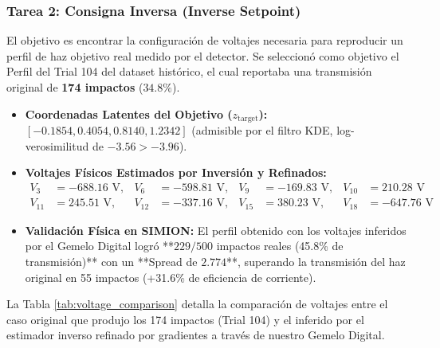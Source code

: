 \documentclass[12pt,letterpaper]{article}
\begin{document}
\subsubsection{Tarea 2: Consigna Inversa (Inverse Setpoint)}
El objetivo es encontrar la configuración de voltajes necesaria para reproducir un perfil de haz objetivo real medido por el detector. Se seleccionó como objetivo el Perfil del Trial 104 del dataset histórico, el cual reportaba una transmisión original de \textbf{174 impactos} ($34.8\%$).
\begin{itemize}
    \item \textbf{Coordenadas Latentes del Objetivo ($z_{\text{target}}$):} $[-0.1854, 0.4054, 0.8140, 1.2342]$ (admisible por el filtro KDE, log-verosimilitud de $-3.56 > -3.96$).
    \item \textbf{Voltajes Físicos Estimados por Inversión y Refinados:} 
    \begin{align*}
        V_3 &= -688.16\text{ V}, & V_6 &= -598.81\text{ V}, & V_9 &= -169.83\text{ V}, & V_{10} &= 210.28\text{ V} \\
        V_{11} &= 245.51\text{ V}, & V_{12} &= -337.16\text{ V}, & V_{15} &= 380.23\text{ V}, & V_{18} &= -647.76\text{ V}
    \end{align*}
    \item \textbf{Validación Física en SIMION:} El perfil obtenido con los voltajes inferidos por el Gemelo Digital logró **$229/500$ impactos reales (45.8\% de transmisión)** con un **Spread de $2.774$**, superando la transmisión del haz original en 55 impactos (+31.6\% de eficiencia de corriente).
\end{itemize}

La Tabla \ref{tab:voltage_comparison} detalla la comparación de voltajes entre el caso original que produjo los 174 impactos (Trial 104) y el inferido por el estimador inverso refinado por gradientes a través de nuestro Gemelo Digital.
\end{document}
